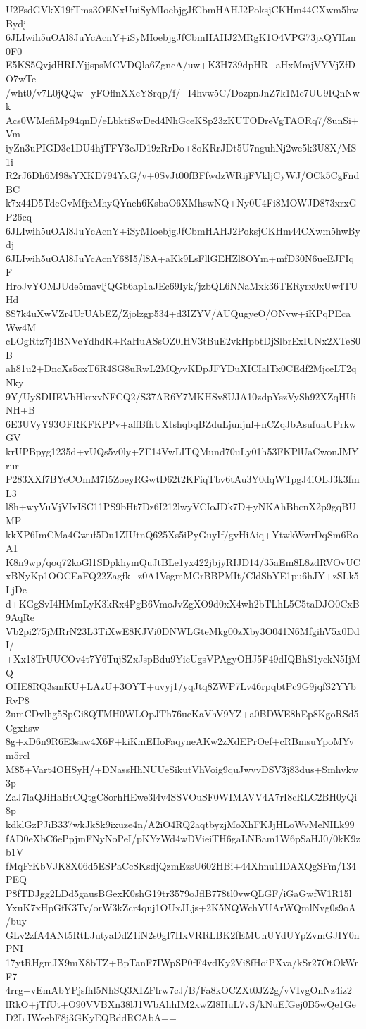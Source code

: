 U2FsdGVkX19fTms3OENxUuiSyMIoebjgJfCbmHAHJ2PoksjCKHm44CXwm5hwBydj
6JLIwih5uOAl8JuYcAcnY+iSyMIoebjgJfCbmHAHJ2MRgK1O4VPG73jxQYlLm0F0
E5KS5QvjdHRLYjjspsMCVDQla6ZgncA/uw+K3H739dpHR+aHxMmjVYVjZfDO7wTe
/wht0/v7L0jQQw+yFOflnXXcYSrqp/f/+I4hvw5C/DozpnJnZ7k1Mc7UU9IQnNwk
Acs0WMefiMp94qnD/eLbktiSwDed4NhGceKSp23zKUTODreVgTAORq7/8unSi+Vm
iyZn3uPIGD3c1DU4hjTFY3eJD19zRrDo+8oKRrJDt5U7nguhNj2we5k3U8X/MS1i
R2rJ6Dh6M98sYXKD794YxG/v+0SvJt00fBFfwdzWRijFVkljCyWJ/OCk5CgFndBC
k7x44D5TdeGvMfjxMhyQYneh6KsbaO6XMhswNQ+Ny0U4Fi8MOWJD873xrxGP26cq
6JLIwih5uOAl8JuYcAcnY+iSyMIoebjgJfCbmHAHJ2PoksjCKHm44CXwm5hwBydj
6JLIwih5uOAl8JuYcAcnY68I5/l8A+aKk9LsFllGEHZl8OYm+mfD30N6ueEJFIqF
HroJvYOMJUde5mavljQGb6ap1aJEc69Iyk/jzbQL6NNaMxk36TERyrx0xUw4TUHd
8S7k4uXwVZr4UrUAbEZ/Zjolzgp534+d3IZYV/AUQugyeO/ONvw+iKPqPEcaWw4M
cLOgRtz7j4BNVcYdhdR+RaHuASsOZ0lHV3tBuE2vkHpbtDjSlbrExIUNx2XTeS0B
ah81u2+DncXs5oxT6R4SG8uRwL2MQyvKDpJFYDuXICIalTx0CEdf2MjceLT2qNky
9Y/UySDIIEVbHkrxvNFCQ2/S37AR6Y7MKHSv8UJA10zdpYszVySh92XZqHUiNH+B
6E3UVyY93OFRKFKPPv+affBfhUXtshqbqBZduLjunjnl+nCZqJbAsufuaUPrkwGV
krUPBpyg1235d+vUQs5v0ly+ZE14VwLITQMund70uLy01h53FKPlUaCwonJMYrur
P283XXf7BYcCOmM7I5ZoeyRGwtD62t2KFiqTbv6tAu3Y0dqWTpgJ4iOLJ3k3fmL3
l8h+wyVuVjVIvISC11PS9bHt7Dz6I212lwyVCIoJDk7D+yNKAhBbcnX2p9gqBUMP
kkXP6ImCMa4Gwuf5Du1ZIUtnQ625Xs5iPyGuyIf/gvHiAiq+YtwkWwrDqSm6RoA1
K8n9wp/qoq72koGl1SDpkhymQuJtBLe1yx422jbjyRIJD14/35aEm8L8zdRVOvUC
xBNyKp1OOCEaFQ22Zagfk+z0A1VsgmMGrBBPMIt/CldSbYE1pu6hJY+zSLk5LjDe
d+KGgSvI4HMmLyK3kRx4PgB6VmoJvZgXO9d0xX4wh2bTLhL5C5taDJO0CxB9AqRe
Vb2pi275jMRrN23L3TiXwE8KJVi0DNWLGteMkg00zXby3O041N6MfgihV5x0DdI/
+Xx18TrUUCOv4t7Y6TujSZxJspBdu9YicUgsVPAgyOHJ5F49dIQBhS1yckN5IjMQ
OHE8RQ3smKU+LAzU+3OYT+uvyj1/yqJtq8ZWP7Lv46rpqbtPc9G9jqfS2YYbRvP8
2umCDvlhg5SpGi8QTMH0WLOpJTh76ueKaVhV9YZ+a0BDWE8hEp8KgoRSd5Cgxhsw
8g+xD6n9R6E3saw4X6F+kiKmEHoFaqyneAKw2zXdEPrOef+cRBmsuYpoMYvm5rcl
M85+Vart4OHSyH/+DNassHhNUUeSikutVhVoig9quJwvvDSV3j83dus+Smhvkw3p
ZaJ7laQJiHaBrCQtgC8orhHEwe3l4v4SSVOuSF0WIMAVV4A7rI8cRLC2BH0yQi8p
kdklGzPJiB337wkJk8k9ixuze4n/A2iO4RQ2aqtbyzjMoXhFKJjHLoWvMeNILk99
fAD0eXbC6ePpjmFNyNoPeI/pKYzWd4wDVieiTH6gaLNBam1W6pSaHJ0/0kK9zb1V
fMqFrKbVJK8X06d5ESPaCcSKsdjQzmEzsU602HBi+44Xhnu1IDAXQgSFm/134PEQ
P8fTDJgg2LDd5gausBGexK0shG19tr3579oJflB778tl0vwQLGF/iGaGwfW1R15l
YxuK7xHpGfK3Tv/orW3kZcr4quj1OUxJLjs+2K5NQWchYUArWQmlNvg0s9oA/buy
GLv2zfA4ANt5RtLJutyaDdZ1iN2s0gI7HxVRRLBK2fEMUhUYdUYpZvmGJIY0nPNI
17ytRHgmJX9mX8bTZ+BpTanF7IWpSP0fF4vdKy2Vi8fHoiPXva/kSr27OtOkWrF7
4rrg+vEmAbYPjsfhl5NhSQ3XIZFlrw7cJ/B/Fa8kOCZXt0JZ2g/vVIvgOnNz4iz2
lRkO+jTfUt+O90VVBXn38lJ1WbAhhIM2xwZl8HuL7vS/kNuEfGej0B5wQe1GeD2L
IWeebF8j3GKyEQBddRCAbA==
